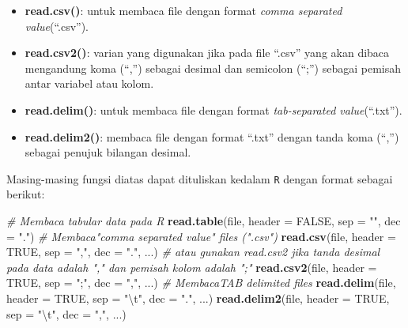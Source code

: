 \documentclass[]{book}
\newenvironment{Shaded}{\begin{snugshade}}{\end{snugshade}}
\newcommand{\KeywordTok}[1]{\textcolor[rgb]{0.13,0.29,0.53}{\textbf{#1}}}
\newcommand{\DataTypeTok}[1]{\textcolor[rgb]{0.13,0.29,0.53}{#1}}
\newcommand{\CharTok}[1]{\textcolor[rgb]{0.31,0.60,0.02}{#1}}
\newcommand{\StringTok}[1]{\textcolor[rgb]{0.31,0.60,0.02}{#1}}
\newcommand{\CommentTok}[1]{\textcolor[rgb]{0.56,0.35,0.01}{\textit{#1}}}
\newcommand{\OtherTok}[1]{\textcolor[rgb]{0.56,0.35,0.01}{#1}}
\newcommand{\NormalTok}[1]{#1}
\providecommand{\tightlist}{%
  \setlength{\itemsep}{0pt}\setlength{\parskip}{0pt}}
\begin{document}
\begin{itemize}
\tightlist
\item
  \textbf{read.csv()}: untuk membaca file dengan format \emph{comma
  separated value}(``.csv'').
\item
  \textbf{read.csv2()}: varian yang digunakan jika pada file ``.csv''
  yang akan dibaca mengandung koma (``,'') sebagai desimal dan semicolon
  (``;'') sebagai pemisah antar variabel atau kolom.
\item
  \textbf{read.delim()}: untuk membaca file dengan format
  \emph{tab-separated value}(``.txt'').
\item
  \textbf{read.delim2()}: membaca file dengan format ``.txt'' dengan
  tanda koma (``,'') sebagai penujuk bilangan desimal.
\end{itemize}

Masing-masing fungsi diatas dapat dituliskan kedalam \texttt{R} dengan
format sebagai berikut:

\begin{Shaded}
\begin{Highlighting}[]
\CommentTok{# Membaca tabular data pada  R}
\KeywordTok{read.table}\NormalTok{(file, }\DataTypeTok{header =} \OtherTok{FALSE}\NormalTok{, }\DataTypeTok{sep =} \StringTok{""}\NormalTok{, }\DataTypeTok{dec =} \StringTok{"."}\NormalTok{)}
\CommentTok{# Membaca"comma separated value" files (".csv")}
\KeywordTok{read.csv}\NormalTok{(file, }\DataTypeTok{header =} \OtherTok{TRUE}\NormalTok{, }\DataTypeTok{sep =} \StringTok{","}\NormalTok{, }\DataTypeTok{dec =} \StringTok{"."}\NormalTok{, ...)}
\CommentTok{# atau gunakan read.csv2 jika tanda desimal pada data adalah "," dan pemisah kolom adalah ";"}
\KeywordTok{read.csv2}\NormalTok{(file, }\DataTypeTok{header =} \OtherTok{TRUE}\NormalTok{, }\DataTypeTok{sep =} \StringTok{";"}\NormalTok{, }\DataTypeTok{dec =} \StringTok{","}\NormalTok{, ...)}
\CommentTok{# MembacaTAB delimited files}
\KeywordTok{read.delim}\NormalTok{(file, }\DataTypeTok{header =} \OtherTok{TRUE}\NormalTok{, }\DataTypeTok{sep =} \StringTok{"}\CharTok{\textbackslash{}t}\StringTok{"}\NormalTok{, }\DataTypeTok{dec =} \StringTok{"."}\NormalTok{, ...)}
\KeywordTok{read.delim2}\NormalTok{(file, }\DataTypeTok{header =} \OtherTok{TRUE}\NormalTok{, }\DataTypeTok{sep =} \StringTok{"}\CharTok{\textbackslash{}t}\StringTok{"}\NormalTok{, }\DataTypeTok{dec =} \StringTok{","}\NormalTok{, ...)}
\end{Highlighting}
\end{Shaded}
\end{document}
